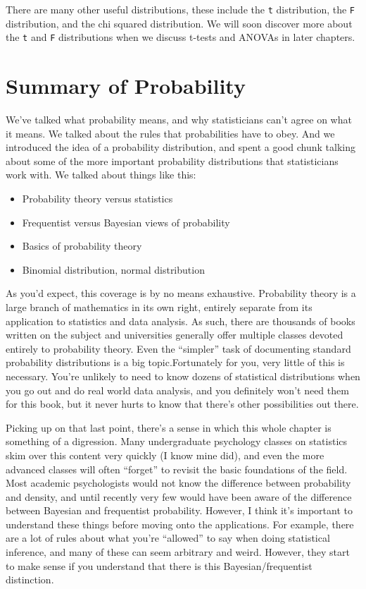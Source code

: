 \documentclass[
]{book}
\begin{document}
There are many other useful distributions, these include the \texttt{t} distribution, the \texttt{F} distribution, and the chi squared distribution. We will soon discover more about the \texttt{t} and \texttt{F} distributions when we discuss t-tests and ANOVAs in later chapters.

\hypertarget{summary-of-probability}{%
\section{Summary of Probability}\label{summary-of-probability}}

We've talked what probability means, and why statisticians can't agree on what it means. We talked about the rules that probabilities have to obey. And we introduced the idea of a probability distribution, and spent a good chunk talking about some of the more important probability distributions that statisticians work with. We talked about things like this:

\begin{itemize}
\item
  Probability theory versus statistics
\item
  Frequentist versus Bayesian views of probability
\item
  Basics of probability theory
\item
  Binomial distribution, normal distribution
\end{itemize}

As you'd expect, this coverage is by no means exhaustive. Probability theory is a large branch of mathematics in its own right, entirely separate from its application to statistics and data analysis. As such, there are thousands of books written on the subject and universities generally offer multiple classes devoted entirely to probability theory. Even the ``simpler'' task of documenting standard probability distributions is a big topic.Fortunately for you, very little of this is necessary. You're unlikely to need to know dozens of statistical distributions when you go out and do real world data analysis, and you definitely won't need them for this book, but it never hurts to know that there's other possibilities out there.

Picking up on that last point, there's a sense in which this whole chapter is something of a digression. Many undergraduate psychology classes on statistics skim over this content very quickly (I know mine did), and even the more advanced classes will often ``forget'' to revisit the basic foundations of the field. Most academic psychologists would not know the difference between probability and density, and until recently very few would have been aware of the difference between Bayesian and frequentist probability. However, I think it's important to understand these things before moving onto the applications. For example, there are a lot of rules about what you're ``allowed'' to say when doing statistical inference, and many of these can seem arbitrary and weird. However, they start to make sense if you understand that there is this Bayesian/frequentist distinction.
\end{document}
